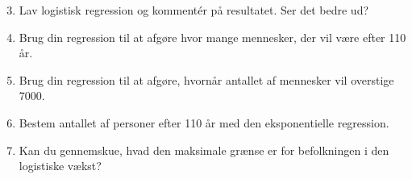 \begin{enumerate}[label=\roman*)]
	\setcounter{enumi}{2}
	\item Lav logistisk regression og kommentér på resultatet. Ser det bedre ud?
	\item Brug din regression til at afgøre hvor mange mennesker, der vil være efter 110 år.
	\item Brug din regression til at afgøre, hvornår antallet af mennesker vil overstige 7000.
	\item Bestem antallet af personer efter 110 år med den eksponentielle regression. 
	\item Kan du gennemskue, hvad den maksimale grænse er for befolkningen i den logistiske vækst?
\end{enumerate}
